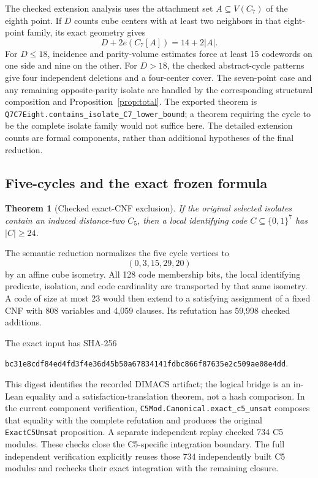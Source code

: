 \documentclass[11pt]{article}
\newtheorem{theorem}{Theorem}[section]
\theoremstyle{definition}\newtheorem{definition}[theorem]{Definition}
\theoremstyle{remark}\newtheorem{remark}[theorem]{Remark}
\newcommand{\card}[1]{\lvert #1\rvert}
\newcommand{\src}[1]{{\small\nolinkurl{#1}}}
\newcommand{\bits}{\{0,1\}}
\begin{document}
The checked extension analysis uses the attachment set $A\subseteq V(C_7)$ of the eighth point. If $D$ counts cube centers with at least two neighbors in that eight-point family, its exact geometry gives
\[
 D+2e(C_7[A])=14+2\card A.
\]
For $D\le18$, incidence and parity-volume estimates force at least 15 codewords on one side and nine on the other. For $D>18$, the checked abstract-cycle patterns give four independent deletions and a four-center cover. The seven-point case and any remaining opposite-parity isolate are handled by the corresponding structural composition and Proposition~\ref{prop:total}. The exported theorem is \src{Q7C7Eight.contains_isolate_C7_lower_bound}; a theorem requiring the cycle to be the complete isolate family would not suffice here. The detailed extension counts are formal components, rather than additional hypotheses of the final reduction.

\subsection{Five-cycles and the exact frozen formula}
\begin{theorem}[Checked exact-CNF exclusion]\label{thm:c5}
If the original selected isolates contain an induced distance-two $C_5$, then a local identifying code $C\subseteq\bits^7$ has $\card C\ge24$.
\end{theorem}
The semantic reduction normalizes the five cycle vertices to
\[
 (0,3,15,29,20)
\]
by an affine cube isometry. All 128 code membership bits, the local identifying predicate, isolation, and code cardinality are transported by that same isometry. A code of size at most 23 would then extend to a satisfying assignment of a fixed CNF with 808 variables and 4,059 clauses. Its refutation has 59,998 checked additions.

The exact input has SHA-256
\begin{center}\small\src{bc31e8cdf84ed4fd3f4e36d45b50a67834141fdbc866f87635e2c509ae08e4dd}.\end{center}
This digest identifies the recorded DIMACS artifact; the logical bridge is an in-Lean equality and a satisfaction-translation theorem, not a hash comparison. In the current component verification, \src{C5Mod.Canonical.exact_c5_unsat} composes that equality with the complete refutation and produces the original \src{ExactC5Unsat} proposition. A separate independent replay checked 734 C5 modules. These checks close the C5-specific integration boundary. The full independent verification explicitly reuses those 734 independently built C5 modules and rechecks their exact integration with the remaining closure.
\end{document}
